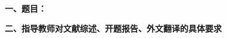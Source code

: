 {
    \setlength{\parindent}{0em}
    \vspace{0.5em}
    \par {\bfseries 一、题目：\hfill \Title \hfill} \\
    \par {\bfseries 二、指导教师对文献综述、开题报告、外文翻译的具体要求}
}

\mbox{} \vfill

\signature{指导教师（签名）}
